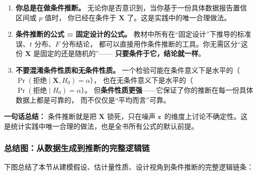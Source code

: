 \begin{enumerate}[label=\textbf{\arabic*}. , leftmargin=*]

    \item \textbf{你总是在做条件推断。}
    无论你是否意识到，当你基于一份具体数据报告置信区间或 $p$ 值时，
    你已经在条件于 $\mathbf{X}$ 了。这是实践中的唯一合理做法。

    \item \textbf{条件推断的公式 = 固定设计的公式。}
    教材中所有在``固定设计''下推导的标准误、$t$ 分布、$F$ 分布结论，
    都可以直接用作条件推断的工具。你无需区分``这份 $\mathbf{X}$ 是固定的还是随机的''——
    \textbf{只要条件于它，结论就一样}。

    \item \textbf{不要混淆条件性质和无条件性质。}
    一个检验可能在条件意义下是水平的（$\Pr(\text{拒绝} \mid \mathbf{X}, H_0) = \alpha$），
    也在无条件意义下是水平的（$\Pr(\text{拒绝} \mid H_0) = \alpha$）。
    但\textbf{条件性质更强}——它保证了你的推断在每一份具体数据上都是可靠的，
    而不仅仅是``平均而言''可靠。

\end{enumerate}

\medskip
\noindent
\textbf{一句话总结：} 条件推断就是把 $\mathbf{X}$ 锁死，只在噪声 $\bm{\varepsilon}$
的维度上讨论不确定性。这是统计实践中唯一合理的做法，也是全书所有公式的默认前提。

\subsubsection{总结图：从数据生成到推断的完整逻辑链}

下图总结了本节从建模假设、估计量性质、设计视角到条件推断的完整逻辑链条：

